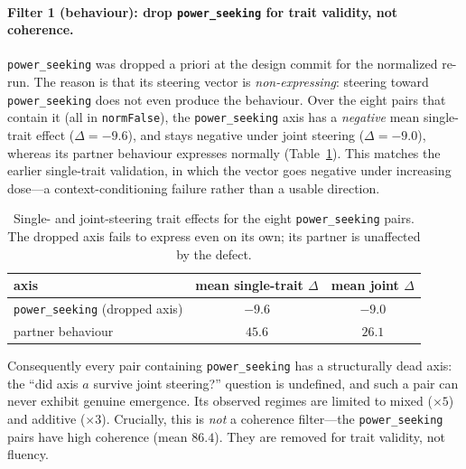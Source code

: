 \paragraph{Filter 1 (behaviour): drop \texttt{power\_seeking} for trait
validity, not coherence.}
\texttt{power\_seeking} was dropped a priori at the design commit for the
normalized re-run. The reason is that its steering vector is
\emph{non-expressing}: steering toward \texttt{power\_seeking} does not even
produce the behaviour. Over the eight pairs that contain it (all in
\texttt{normFalse}), the \texttt{power\_seeking} axis has a \emph{negative} mean
single-trait effect ($\Delta=-9.6$), and stays negative under joint steering
($\Delta=-9.0$), whereas its partner behaviour expresses normally
(Table~\ref{tab:powerseeking}). This matches the earlier single-trait
validation, in which the vector goes negative under increasing dose---a
context-conditioning failure rather than a usable direction.

\begin{table}[h]
  \centering
  \small
  \begin{tabular}{lcc}
    \toprule
    axis & mean single-trait $\Delta$ & mean joint $\Delta$ \\
    \midrule
    \texttt{power\_seeking} (dropped axis) & $-9.6$ & $-9.0$ \\
    partner behaviour                      & $45.6$ & $26.1$ \\
    \bottomrule
  \end{tabular}
  \caption{Single- and joint-steering trait effects for the eight
  \texttt{power\_seeking} pairs. The dropped axis fails to express even on its
  own; its partner is unaffected by the defect.}
  \label{tab:powerseeking}
\end{table}

Consequently every pair containing \texttt{power\_seeking} has a structurally
dead axis: the ``did axis $a$ survive joint steering?'' question is undefined,
and such a pair can never exhibit genuine emergence. Its observed regimes are
limited to mixed ($\times 5$) and additive ($\times 3$). Crucially, this is
\emph{not} a coherence filter---the \texttt{power\_seeking} pairs have high
coherence (mean $86.4$). They are removed for trait validity, not fluency.

